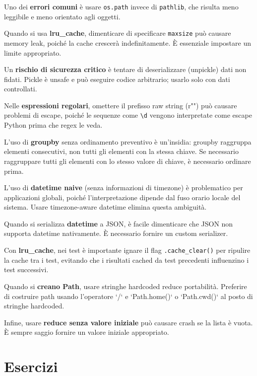 \begin{tcolorbox}[title=Errori Comuni]
Uno dei \textbf{errori comuni} è usare \verb|os.path| invece di \verb|pathlib|, che risulta meno leggibile e meno orientato agli oggetti.

Quando si usa \textbf{lru\_cache}, dimenticare di specificare \verb|maxsize| può causare memory leak, poiché la cache crescerà indefinitamente. È essenziale impostare un limite appropriato.

Un \textbf{rischio di sicurezza critico} è tentare di deserializzare (unpickle) dati non fidati. Pickle è unsafe e può eseguire codice arbitrario; usarlo solo con dati controllati.

Nelle \textbf{espressioni regolari}, omettere il prefisso raw string (r"") può causare problemi di escape, poiché le sequenze come \texttt{\textbackslash d} vengono interpretate come escape Python prima che regex le veda.

L'uso di \textbf{groupby} senza ordinamento preventivo è un'insidia: groupby raggruppa elementi consecutivi, non tutti gli elementi con la stessa chiave. Se necessario raggruppare tutti gli elementi con lo stesso valore di chiave, è necessario ordinare prima.

L'uso di \textbf{datetime naive} (senza informazioni di timezone) è problematico per applicazioni globali, poiché l'interpretazione dipende dal fuso orario locale del sistema. Usare timezone-aware datetime elimina questa ambiguità.

Quando si serializza \textbf{datetime} a JSON, è facile dimenticare che JSON non supporta datetime nativamente. È necessario fornire un custom serializer.

Con \textbf{lru\_cache}, nei test è importante ignare il flag \verb|.cache_clear()| per ripulire la cache tra i test, evitando che i risultati cached da test precedenti influenzino i test successivi.

Quando si \textbf{creano Path}, usare stringhe hardcoded reduce portabilità. Preferire di costruire path usando l'operatore `/` e `Path.home()` o `Path.cwd()` al posto di stringhe hardcoded.

Infine, usare \textbf{reduce senza valore iniziale} può causare crash se la lista è vuota. È sempre saggio fornire un valore iniziale appropriato.
\end{tcolorbox}

\section{Esercizi}

